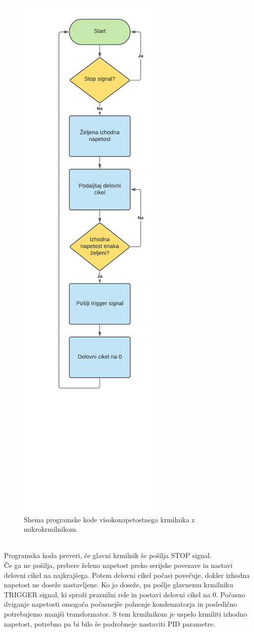 \documentclass[a4paper,twoside,openright,12pt,Slovene]{book}
\begin{document}
	\begin{figure}[H]
    \centering
    \includegraphics[width=0.35\columnwidth]{Sheme/KrmilnikzuCShema.pdf}
    \caption{\label{KrmilnikzuCShema} Shema programske kode visokonapetostnega krmilnika z mikrokrmilnikom.}
	\end{figure}
	
~\\Programska koda preveri, če glavni krmilnik še pošilja STOP signal. 
~\\Če ga ne pošilja, prebere želeno napetost preko serijske povezave in nastavi delovni cikel na najkrajšega. Potem delovni cikel počasi povečuje, dokler izhodna napetost ne doseže nastavljene. Ko jo doseže, pa pošlje glavnemu krmilniku TRIGGER signal, ki sproži praznilni rele in postavi delovni cikel na 0. Počasno dviganje napetosti omogoča počasnejše polnenje kondenzatorja in posledično potrebujemo manjši transformator. S tem krmilnikom je uspelo krmiliti izhodno napetost, potrebno pa bi bilo še podrobneje nastaviti PID parametre.
\end{document}
